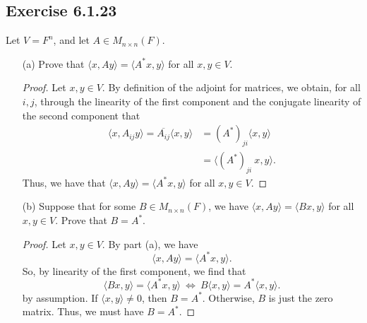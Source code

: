 \subsection*{Exercise 6.1.23} Let \( V = F^{n} \), and let \( A \in {M}_{n \times n }(F) \). 
\begin{enumerate}
    \item[(a)] Prove that \( \langle x  , Ay \rangle = \langle A^{*} x  , y \rangle \) for all \( x,y \in V  \).
        \begin{proof}
        Let \( x,y \in V  \). By definition of the adjoint for matrices, we obtain, for all \( i,j \), through the linearity of the first component and the conjugate linearity of the second component that 
        \begin{align*}
            \langle x  ,  {A}_{ij} y  \rangle = \overline{{A}_{ij}} \langle x , y \rangle &= {(A^{*})}_{ji} \langle x , y \rangle  \\
                                                                                          &= \langle  (A^{*})_{ji} \  x  , y \rangle.
        \end{align*}
        Thus, we have that \( \langle x , Ay  \rangle = \langle A^{*} x  , y \rangle \) for all \( x,y \in V  \).
        \end{proof}
    \item[(b)] Suppose that for some \( B \in {M}_{n \times n}(F) \), we have \( \langle x  , Ay \rangle = \langle B x  , y \rangle \) for all \( x, y \in V  \). Prove that \( B = A^{*} \).
        \begin{proof}
            Let \( x,y \in V  \). By part (a), we have 
            \[  \langle x  , Ay  \rangle = \langle  A^{*} x  , y \rangle. \]
            So, by linearity of the first component, we find that
            \[  \langle B x  , y \rangle = \langle A^{*} x  , y \rangle \ \iff \ B \langle x , y \rangle  = A^{*} \langle x , y \rangle.  \]
            by assumption. If \( \langle x , y \rangle \neq 0  \), then \( B = A^{*} \). Otherwise, \( B  \) is just the zero matrix. Thus, we must have \( B = A^{*} \).
            

\end{proof}
\end{enumerate}
